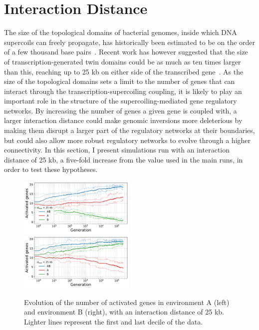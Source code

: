 \section{Interaction Distance}
\label{sec:param:inter25k}

The size of the topological domains of bacterial genomes, inside which DNA supercoils can freely propagate, has historically been estimated to be on the order of a few thousand base pairs~\citep{elhanafi2000,postow2004,kouzine2013}.
Recent work has however suggested that the size of transcription-generated twin domains could be as much as ten times larger than this, reaching up to 25 kb on either side of the transcribed gene~\citep{visser2022}.
As the size of the topological domains sets a limit to the number of genes that can interact through the transcription-supercoiling coupling, it is likely to play an important role in the structure of the supercoiling-mediated gene regulatory networks.
By increasing the number of genes a given gene is coupled with, a larger interaction distance could make genomic inversions more deleterious by making them disrupt a larger part of the regulatory networks at their boundaries, but could also allow more robust regulatory networks to evolve through a higher connectivity.
In this section, I present simulations run with an interaction distance of 25 kb, a five-fold increase from the value used in the main runs, in order to test these hypotheses.

\begin{figure}[H]
\centering
\includegraphics[width=0.495\textwidth]{param/interaction-25k/gene_activity_env_A.pdf}
\includegraphics[width=0.495\textwidth]{param/interaction-25k/gene_activity_env_B.pdf}
\caption[Evolution of the number of activated genes in each environment, with an interaction distance of 25 kb]{Evolution of the number of activated genes in environment A (left) and environment B (right), with an interaction distance of 25 kb.
Lighter lines represent the first and last decile of the data.}
\label{fig:param:inter25k-activ-by-env}
\end{figure}

